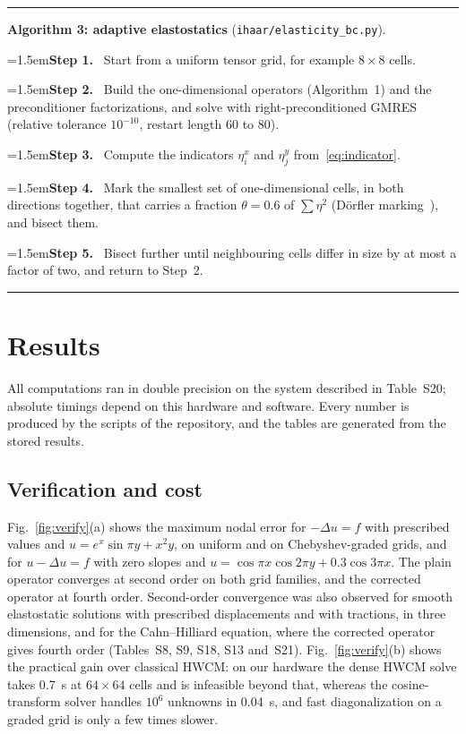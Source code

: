 \documentclass[preprint,12pt]{elsarticle}
\theoremstyle{remark}
\newcommand{\step}[1]{\par\noindent\hangindent=1.5em\hangafter=1\textbf{Step #1.}\ }
\begin{document}
\begin{algorithm}[t]\small\hrule\smallskip
\noindent\textbf{Algorithm 3: adaptive elastostatics} (\texttt{ihaar/elasticity\_bc.py}).
\step{1} Start from a uniform tensor grid, for example $8\times8$ cells.
\step{2} Build the one-dimensional operators (Algorithm~1) and the preconditioner factorizations, and solve with right-preconditioned GMRES (relative tolerance $10^{-10}$, restart length 60 to 80).
\step{3} Compute the indicators $\eta^x_i$ and $\eta^y_j$ from~\eqref{eq:indicator}.
\step{4} Mark the smallest set of one-dimensional cells, in both directions together, that carries a fraction $\theta=0.6$ of $\sum\eta^2$ (D\"orfler marking~\cite{dorfler1996convergent}), and bisect them.
\step{5} Bisect further until neighbouring cells differ in size by at most a factor of two, and return to Step~2.
\smallskip\hrule
\end{algorithm}

\section{Results}\label{sec:results}
All computations ran in double precision on the system described in Table~S20; absolute
timings depend on this hardware and software. Every number is produced by the scripts of the repository,
and the tables are generated from the stored results.

\subsection{Verification and cost}\label{sec:verify}
Fig.~\ref{fig:verify}(a) shows the maximum nodal error for $-\Delta u=f$ with prescribed values and
$u=e^x\sin\pi y+x^2y$, on uniform and on Chebyshev-graded grids, and for $u-\Delta u=f$ with zero slopes
and $u=\cos\pi x\cos2\pi y+0.3\cos3\pi x$. The plain operator converges at second order on both grid
families, and the corrected operator at fourth order. Second-order convergence was also observed for
smooth elastostatic solutions with prescribed displacements and with tractions, in three dimensions, and
for the Cahn--Hilliard equation, where the corrected operator gives fourth order (Tables~S8, S9, S18,
S13 and~S21). Fig.~\ref{fig:verify}(b) shows the practical gain over classical HWCM: on our hardware the
dense HWCM solve takes 0.7~s at $64\times64$ cells and is infeasible beyond that, whereas the
cosine-transform solver handles $10^6$ unknowns in 0.04~s, and fast diagonalization on a graded
grid is only a few times slower.
\end{document}
